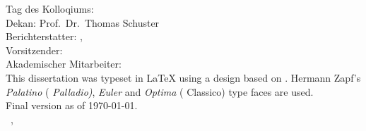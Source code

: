 \thispagestyle{empty}

\hfill
\vfill

{\raggedright
\noindent
Tag des Kolloqiums:  \\
Dekan:   Prof.\ Dr.\ Thomas Schuster\\  
Berichterstatter:  \myProf, \myOtherProf \\
Vorsitzender:  \\
Akademischer Mitarbeiter: \\
\bigskip
\noindent
This dissertation was typeset in \LaTeX{}  using a design based on \texttt{\classicthesis}.
Hermann Zapf's \emph{Palatino} (\emph{ Palladio)}, \emph{Euler} and \emph{Optima} ( Classico) type faces are used.\\
\bigskip
\noindent
{Final version} as of \today.\\
\bigskip
\noindent
\textcopyright\ \myName, \myTime
}
